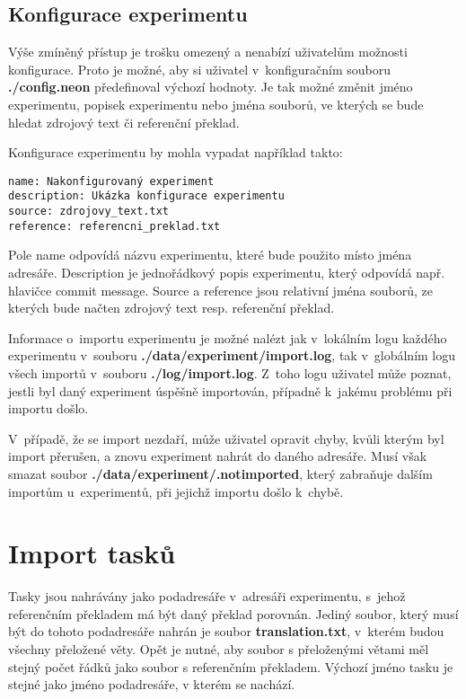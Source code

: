 \subsection{Konfigurace experimentu}
Výše zmíněný přístup je trošku omezený a nenabízí uživatelům možnosti konfigurace.
Proto je možné,
  aby si uživatel v~konfiguračním souboru \textbf{./config.neon} předefinoval výchozí hodnoty.
Je tak možné změnit jméno experimentu, popisek experimentu nebo jména souborů,
  ve kterých se bude hledat zdrojový text či referenční překlad.

Konfigurace experimentu by mohla vypadat například takto: \\

\begin{verbatim}
name: Nakonfigurovaný experiment
description: Ukázka konfigurace experimentu
source: zdrojovy_text.txt
reference: referencni_preklad.txt
\end{verbatim}

Pole name odpovídá názvu experimentu, které bude použito místo jména adresáře.
Description je jednořádkový popis experimentu,
  který odpovídá např. hlavičce commit message.
Source a reference jsou relativní jména souborů,
  ze kterých bude načten zdrojový text resp. referenční překlad.

Informace o~importu experimentu je možné nalézt
  jak v~lokálním logu každého experimentu v~souboru \textbf{./data/experiment/import.log},
  tak v~globálním logu všech importů v~souboru \textbf{./log/import.log}.
Z~toho logu uživatel může poznat,
  jestli byl daný experiment úspěšně importován,
  případně k~jakému problému při importu došlo.

V~případě, že se import nezdaří,
  může uživatel opravit chyby,
  kvůli kterým byl import přerušen,
  a znovu experiment nahrát do daného adresáře.
Musí však smazat soubor \textbf{./data/experiment/.notimported},
  který zabraňuje dalším importům u~experimentů,
  při jejichž importu došlo k~chybě.


\section{Import tasků}
Tasky jsou nahrávány jako podadresáře v~adresáři experimentu,
  s~jehož referenčním překladem má být daný překlad porovnán.
Jediný soubor, který musí být do tohoto podadresáře nahrán je soubor \textbf{translation.txt},
  v~kterém budou všechny přeložené věty.
Opět je nutné, aby soubor s přeloženými větami měl stejný počet řádků jako soubor s referenčním překladem.
Výchozí jméno tasku je stejné jako jméno podadresáře, v kterém se nachází.

